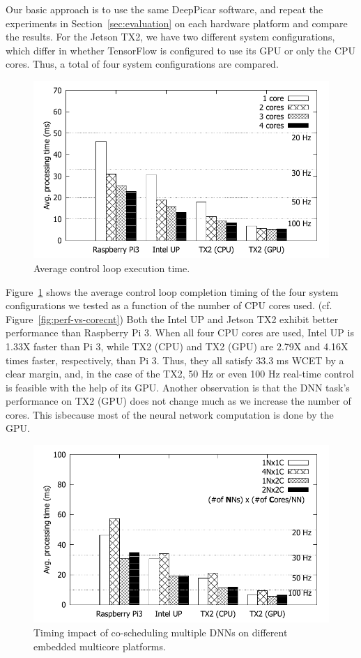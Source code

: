 Our basic approach is to use the same DeepPicar software, and repeat
the experiments in Section~\ref{sec:evaluation} on each hardware
platform and compare the results. 
For the Jetson TX2, we have two different system configurations,
which differ in whether TensorFlow is configured to use its GPU or
only the CPU cores. Thus, a total of four system configurations are
compared.

\begin{figure}[h]
  \centering
  \includegraphics[width=.45\textwidth]{figs/compare_core}
  \caption{Average control loop execution time.} 
  \label{fig:sys_core}
\end{figure}

Figure~\ref{fig:sys_core} shows the average control loop completion
timing of the four system configurations we tested as a function of
the number of CPU cores used. (cf. Figure~\ref{fig:perf-vs-corecnt})
Both the Intel UP and Jetson TX2 exhibit better performance than
Raspberry Pi 3. When all four CPU cores are used, Intel UP is
1.33X faster than Pi 3, while TX2 (CPU) and TX2 (GPU) are 2.79X and
4.16X times faster, respectively, than Pi 3.
Thus, they all satisfy 33.3 ms WCET by a clear margin, and, in the
case of the TX2, 50 Hz or even 100 Hz real-time control is feasible
with the help of its GPU.
Another observation is that the DNN task's performance on TX2 (GPU)
does not change much as we increase the number of cores. This
isbecause most of the neural network computation is done by the GPU.

\begin{figure}[h]
  \centering
  \includegraphics[width=.45\textwidth]{figs/compare_model}
  \caption{Timing impact of co-scheduling multiple DNNs on different
    embedded multicore platforms. %
  }
  \label{fig:sys_model}
\end{figure}

